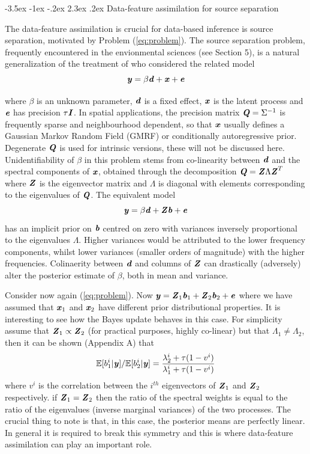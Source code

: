 \documentclass[10pt,a4paper]{article}
\makeatletter
\newcommand{\expect} {{\mathbb{E}}}
\newcommand{\Qmat} {\textbf{\textit{Q}}}
\newcommand{\Zmat} {\textbf{\textit{Z}}}
\newcommand{\Imat} {\textbf{\textit{I}}}
\newcommand{\bvec} {\textbf{\textit{b}}}
\newcommand{\dvec} {\textbf{\textit{d}}}
\newcommand{\evec} {\textbf{\textit{e}}}
\newcommand{\xvec} {\textbf{\textit{x}}}
\newcommand{\yvec} {\textbf{\textit{y}}}
\renewcommand\section{\@startsection{section}{1}{\z@}%
                                  {-3.5ex \@plus -1ex \@minus -.2ex}%
                                  {2.3ex \@plus.2ex}%
                                  {\normalfont\large\bfseries}}
\makeatother
\begin{document}
\section{Data-feature assimilation for source separation}

The data-feature assimilation is crucial for data-based inference is source separation, motivated by Problem (\ref{eq:problem}). The source separation problem, frequently encountered in the envionmental sciences (see Section 5), is a natural generalization of the treatment of \cite{Hodges_2010} who considered the related model
\begin{equation}\label{eq:problem2}
\yvec = \beta \dvec + \xvec + \evec
\end{equation}

\noindent where $\beta$ is an unknown parameter, $\dvec$ is a fixed effect, $\xvec$ is the latent process and $\evec$ has precision $\tau\Imat$. In spatial applications, the precision matrix $\Qmat = \Sigma^{-1}$ is frequently sparse and neighbourhood dependent, so that $\xvec$ usually defines a Gaussian Markov Random Field (GMRF) or conditionally autoregressive prior. Degenerate $\Qmat$ is used for intrinsic versions, these will not be discussed here.  Unidentifiability of $\beta$ in this problem stems from co-linearity between $\dvec$ and the spectral components of $\xvec$, obtained through the decomposition $\Qmat = \Zmat \Lambda \Zmat^T$ where $\Zmat$ is the eigenvector matrix and $\Lambda$ is diagonal with elements corresponding to the eigenvalues of $\Qmat$. The equivalent model
\begin{equation}
\yvec = \beta \dvec + \Zmat \bvec + \evec
\end{equation}
has an implicit prior on $\bvec$ centred on zero with variances inversely proportional to the eigenvalues $\Lambda$. Higher variances would be attributed to the lower frequency components, whilst lower variances (smaller orders of magnitude) with the higher frequencies. Colinaerity between $\dvec$ and columns of $\Zmat$ can drastically (adversely) alter the posterior estimate of $\beta$, both in mean and variance. 

Consider now again (\ref{eq:problem}). Now $\yvec  = \Zmat_1 \bvec_1 + \Zmat_2 \bvec_2 + \evec$ where we have assumed that $\xvec_1$ and $\xvec_2$ have different prior distributional properties. It is interesting to see how the Bayes update behaves in this case. For simplicity assume that $\Zmat_1 \propto \Zmat_2$ (for practical purposes, highly co-linear) but that $\Lambda_1 \ne \Lambda_2$, then it can be shown (Appendix A) that 
\begin{equation}
\expect[b^i_1 | \yvec]/\expect[b^i_2 | \yvec] =\frac{\lambda^i_2 + \tau(1 - v^i)}{\lambda^i_1 + \tau(1- v^i)}
\end{equation}
\noindent where $v^i$ is the correlation between the $i^{th}$ eigenvectors of $\Zmat_1$ and $\Zmat_2$ respectively. if $\Zmat_1 = \Zmat_2$ then the ratio of the spectral weights is equal to the ratio of the eigenvalues (inverse marginal variances) of the two processes. The crucial thing to note is that, in this case, the posterior means are perfectly linear. In general it is required to break this symmetry and this is where data-feature assimilation can play an important role.
\end{document}
